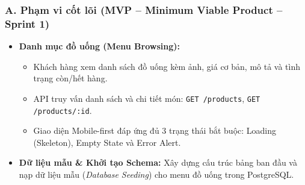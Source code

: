 \documentclass[12pt,a4paper]{article}
\begin{document}
\subsubsection{A. Phạm vi cốt lõi (MVP -- Minimum Viable Product -- Sprint 1)}
\begin{itemize}[leftmargin=*,itemsep=2pt]
    \item \textbf{Danh mục đồ uống (Menu Browsing):}
    \begin{itemize}
        \item Khách hàng xem danh sách đồ uống kèm ảnh, giá cơ bản, mô tả và tình trạng còn/hết hàng.
        \item API truy vấn danh sách và chi tiết món: \texttt{GET /products}, \texttt{GET /products/:id}.
        \item Giao diện Mobile-first đáp ứng đủ 3 trạng thái bắt buộc: Loading (Skeleton), Empty State và Error Alert.
    \end{itemize}
    \item \textbf{Dữ liệu mẫu \& Khởi tạo Schema:} Xây dựng cấu trúc bảng ban đầu và nạp dữ liệu mẫu (\textit{Database Seeding}) cho menu đồ uống trong PostgreSQL.
\end{itemize}
\end{document}
